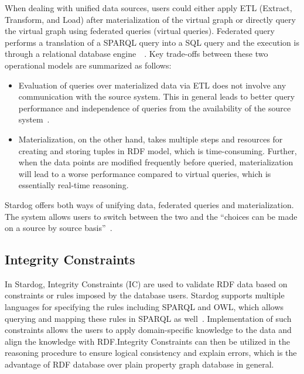 		When dealing with unified data sources, users could either apply ETL 
		(Extract, Transform, and Load) after materialization of the virtual graph 
		or 	directly query the virtual graph using federated queries (virtual 
		queries). Federated query performs a translation of a SPARQL query into 
		a SQL query and the execution is through a relational database 
		engine~\cite{hid-sp18-405-blog-stardog-virtual2}~\cite{hid-sp18-405-diego2017ontop-stardog}.
		Key trade-offs between these two operational models are summarized 
		as follows:
		
		 \begin{itemize}
		 	
			\item Evaluation of queries over materialized data via ETL does not 
			involve any communication with the source system. This in general 
			leads to better query performance and independence of queries from 
			the availability of the source 
			system~\cite{hid-sp18-405-blog-stardog-virtual}.
			
			\item Materialization, on the other hand, takes multiple steps and 
			resources for creating and storing tuples in RDF model, which is 
			time-consuming. Further, when the data points are modified 
			frequently before queried, materialization will lead to a worse 
			performance compared to virtual queries, which is essentially 
			real-time reasoning.
			
		\end{itemize}
	
		Stardog offers both ways of unifying data, federated queries and 
		materialization. The system allows users to switch between the two and 
		the ``choices can be made on a source by source 
		basis''~\cite{hid-sp18-405-blog-stardog-virtual}.
	
	\subsection{Integrity Constraints}
		In Stardog, Integrity Constraints (IC) are used to validate RDF data 
		based on constraints or rules imposed by the database users. Stardog 
		supports multiple languages for specifying the rules including SPARQL 
		and OWL, which allows querying and mapping these rules in SPARQL as 
		well~\cite{hid-sp18-405-www-stardog-docs}. Implementation of such 
		constraints allows the users to apply domain-specific knowledge to the 
		data and align the knowledge with RDF.\@ Integrity Constraints can then 
		be utilized in the reasoning procedure to ensure logical consistency and 
		explain errors, which is the advantage of RDF database over plain 
		property graph database in general. 

